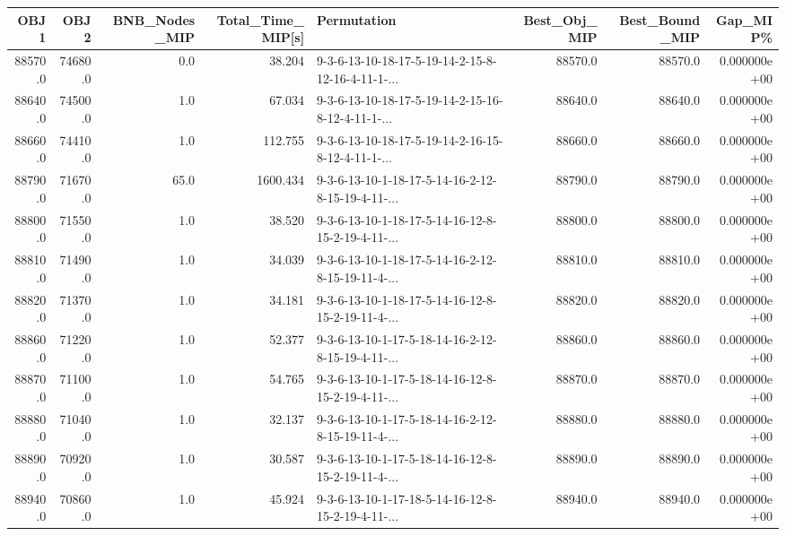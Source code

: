 \begin{tabular}{rrrrlrrr}
\toprule
    OBJ1 &     OBJ2 &  BNB\_Nodes\_MIP &  Total\_Time\_MIP[s] &                                        Permutation &  Best\_Obj\_MIP &  Best\_Bound\_MIP &      Gap\_MIP\% \\
\midrule
 88570.0 &  74680.0 &            0.0 &             38.204 &  9-3-6-13-10-18-17-5-19-14-2-15-8-12-16-4-11-1-... &       88570.0 &         88570.0 &  0.000000e+00 \\
 88640.0 &  74500.0 &            1.0 &             67.034 &  9-3-6-13-10-18-17-5-19-14-2-15-16-8-12-4-11-1-... &       88640.0 &         88640.0 &  0.000000e+00 \\
 88660.0 &  74410.0 &            1.0 &            112.755 &  9-3-6-13-10-18-17-5-19-14-2-16-15-8-12-4-11-1-... &       88660.0 &         88660.0 &  0.000000e+00 \\
 88790.0 &  71670.0 &           65.0 &           1600.434 &  9-3-6-13-10-1-18-17-5-14-16-2-12-8-15-19-4-11-... &       88790.0 &         88790.0 &  0.000000e+00 \\
 88800.0 &  71550.0 &            1.0 &             38.520 &  9-3-6-13-10-1-18-17-5-14-16-12-8-15-2-19-4-11-... &       88800.0 &         88800.0 &  0.000000e+00 \\
 88810.0 &  71490.0 &            1.0 &             34.039 &  9-3-6-13-10-1-18-17-5-14-16-2-12-8-15-19-11-4-... &       88810.0 &         88810.0 &  0.000000e+00 \\
 88820.0 &  71370.0 &            1.0 &             34.181 &  9-3-6-13-10-1-18-17-5-14-16-12-8-15-2-19-11-4-... &       88820.0 &         88820.0 &  0.000000e+00 \\
 88860.0 &  71220.0 &            1.0 &             52.377 &  9-3-6-13-10-1-17-5-18-14-16-2-12-8-15-19-4-11-... &       88860.0 &         88860.0 &  0.000000e+00 \\
 88870.0 &  71100.0 &            1.0 &             54.765 &  9-3-6-13-10-1-17-5-18-14-16-12-8-15-2-19-4-11-... &       88870.0 &         88870.0 &  0.000000e+00 \\
 88880.0 &  71040.0 &            1.0 &             32.137 &  9-3-6-13-10-1-17-5-18-14-16-2-12-8-15-19-11-4-... &       88880.0 &         88880.0 &  0.000000e+00 \\
 88890.0 &  70920.0 &            1.0 &             30.587 &  9-3-6-13-10-1-17-5-18-14-16-12-8-15-2-19-11-4-... &       88890.0 &         88890.0 &  0.000000e+00 \\
 88940.0 &  70860.0 &            1.0 &             45.924 &  9-3-6-13-10-1-17-18-5-14-16-12-8-15-2-19-4-11-... &       88940.0 &         88940.0 &  0.000000e+00 \\

\end{tabular}
